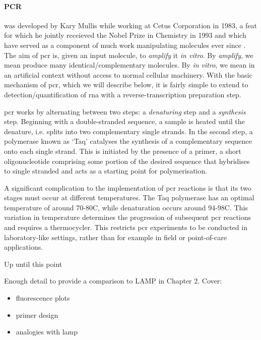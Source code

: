 \documentclass[thesis.tex]{subfiles}
\begin{document}
\paragraph{PCR}
  was developed by Kary Mullis while working at Cetus Corporation in 1983, a feat for which he jointly receieved the Nobel Prize in Chemistry in 1993 and which have served as a component of much work manipulating  molecules ever since \citep{saiki_enzymatic_1985, mullis_specific_1986}. The aim of \gls{pcr} is, given an input  molecule, to \emph{amplify} it \emph{in vitro}. By \emph{amplify}, we mean produce many identical/complementary  molecules. By \emph{in vitro}, we mean in an artificial context without access to normal cellular machinery. With the basic mechanism of \gls{pcr}, which we will describe below, it is fairly simple to extend to detection/quantification of \gls{rna} with a reverse-transcription preparation step.

\Gls{pcr} works by alternating between two steps: a \emph{denaturing} step and a \emph{synthesis} step. Beginning with a double-stranded  sequence, a sample is heated until the  denature, i.e. splits into two complementary single strands. In the second step, a polymerase known as `Taq' catalyses the synthesis of a complementary sequence onto each single strand. This is initiated by the presence of a primer, a short oligonucleotide comprising some portion of the desired sequence that hybridises to single stranded  and acts as a starting point for polymerisation. 

A significant complication to the implementation of \gls{pcr} reactions is that its two stages must occur at different temperatures. The Taq polymerase has an optimal temperature of around 70-80\nolinebreak\textdegree\nolinebreak C, while denaturation occurs around 94-98\nolinebreak\textdegree\nolinebreak C. This variation in temperature determines the progression of subsequent \gls{pcr} reactions and requires a thermocycler. This restricts \gls{pcr} experiments to be conducted in laboratory-like settings, rather than for example in field or point-of-care applications.

Up until this point 

{\color{red} Enough detail to provide a comparison to LAMP in Chapter 2. Cover:
\begin{itemize}
    \item fluorescence plots
    \item primer design
    \item analogies with lamp
\end{itemize}}
\end{document}
